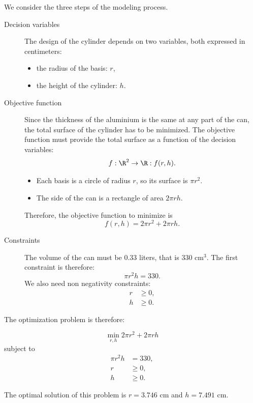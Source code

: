 
We consider the three steps of the modeling process.

\begin{description}
\item[Decision variables] The design of the cylinder depends on two
  variables, both expressed in centimeters:
  \begin{itemize}
  \item the radius of the basis: $r$,
   \item the height of the cylinder: $h$.
  \end{itemize}

  \begin{center}
  \end{center}

  
\item[Objective function] Since the thickness of the aluminium is the same
at any part of the can, the total surface of the cylinder has to be
  minimized. The objective function must provide the total surface as
  a function of the decision variables:
  \[
f:\R^2 \to \R: f(r,h).
  \]
  \begin{itemize}
\item Each basis is a circle of radius $r$, so its surface is $\pi
  r^2$.
 \item The side of the can is a rectangle of area $2\pi r h$.
  \end{itemize}
  Therefore, the objective function to minimize is
  \[
f(r,h) = 2 \pi r^2 + 2 \pi r h.
  \]
\item[Constraints] The volume of the can must be 0.33 liters, that is
  330 cm$^3$. The first constraint is therefore:
  \[
  \pi r^2 h = 330.
  \]
  We also need non negativity constraints:
  \begin{align*}
    r & \geq 0, \\
    h & \geq 0.
  \end{align*}
\end{description}

The optimization problem is therefore:

\[
\min_{r,h} 2 \pi r^2 + 2 \pi r h
\]
subject to
  \begin{align*}
  \pi r^2 h &= 330, \\
    r & \geq 0, \\
    h & \geq 0.
  \end{align*}

The optimal solution of this problem is $r = 3.746$ cm and $h = 7.491$ cm.


